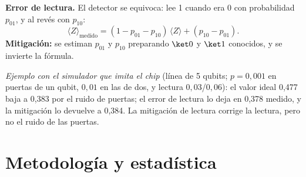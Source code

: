 \documentclass[11pt,a4paper]{article}
\begin{document}
\textbf{Error de lectura.} El detector se equivoca: lee 1 cuando era 0 con probabilidad $p_{01}$, y al revés con $p_{10}$:
\[
  \langle Z\rangle_{\text{medido}} = (1 - p_{01} - p_{10})\,\langle Z\rangle + (p_{10} - p_{01}).
\]
\textbf{Mitigación:} se estiman $p_{01}$ y $p_{10}$ preparando $\ket0$ y $\ket1$ conocidos, y se invierte la fórmula.

\emph{Ejemplo con el simulador que imita el chip} (línea de 5 qubits; $p=0{,}001$ en puertas de un qubit, $0{,}01$ en
las de dos, y lectura $0{,}03$/$0{,}06$): el valor ideal 0,477 baja a 0,383 por el ruido de puertas; el error de lectura
lo deja en 0,378 medido, y la mitigación lo devuelve a 0,384. La mitigación de lectura corrige la lectura, pero no el
ruido de las puertas.

\section{Metodología y estadística}
\end{document}

